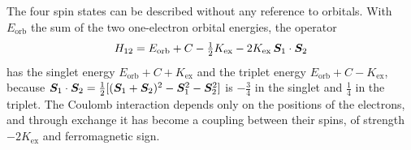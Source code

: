 The four spin states can be described without any reference to orbitals. With $E_{\mathrm{orb}}$ the sum of the two one-electron orbital energies, the operator
\begin{equation}
  H_{12} = E_{\mathrm{orb}} + C - \tfrac12K_{\mathrm{ex}} - 2K_{\mathrm{ex}}\,\bm{S}_1\cdot\bm{S}_2
  \label{eq:7.1-dirac}
\end{equation}
has the singlet energy $E_{\mathrm{orb}} + C + K_{\mathrm{ex}}$ and the triplet energy $E_{\mathrm{orb}} + C - K_{\mathrm{ex}}$, because $\bm{S}_1\cdot\bm{S}_2 = \frac12[(\bm{S}_1 + \bm{S}_2)^2 - \bm{S}_1^2 - \bm{S}_2^2]$ is $-\frac34$ in the singlet and $\frac14$ in the triplet. The Coulomb interaction depends only on the positions of the electrons, and through exchange it has become a coupling between their spins, of strength $-2K_{\mathrm{ex}}$ and ferromagnetic sign.

